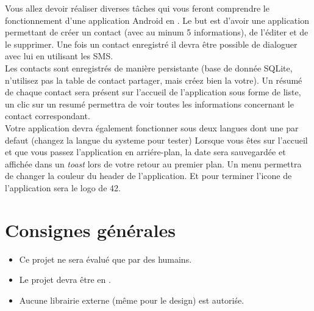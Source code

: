 \documentclass{42}
\begin{document}
	Vous allez devoir r\'ealiser diverses t\^aches qui vous feront comprendre le
	fonctionnement d'une application Android en \@JAVA.
	Le but est d'avoir une application permettant de cr\'eer un contact (avec au minum 5 informations),
	de l'\'editer et de le supprimer. Une fois un contact enregistr\'e il devra
	\^etre possible de dialoguer avec lui en utilisant les SMS.\\
	
	\vspace{5mm}
	Les contacts sont enregistr\'es de mani\`ere persistante (base de donn\'ee 
	SQLite, n'utilisez pas la table de contact partager, mais cr\'eez bien la votre).
	Un r\'esum\'e de chaque contact sera pr\'esent sur l'accueil de l'application
	sous forme de liste, un clic sur un resum\'e permettra de voir toutes les
	informations concernant le contact correspondant.\\

	\vspace{5mm}
	Votre application devra \'egalement fonctionner sous deux langues dont une par defaut
	(changez la langue du systeme pour tester) Lorsque vous \^etes
	sur l'accueil et que vous passez l'application en arri\'ere-plan, la date
	sera sauvegard\'ee et affich\'ee dans un \textit{toast} lors de votre
	retour au premier plan. Un menu permettra de changer la couleur du header
	de l'application. Et pour terminer l'icone de l'application sera le logo de
	42.

\chapter{Consignes g\'en\'erales}

	\begin{itemize}\itemsep6pt
		\item Ce projet ne sera évalué que par des humains.
		\item Le projet devra \^etre en \@JAVA.
		\item Aucune librairie externe (m\^eme pour le design) est autori\'se.
	\end{itemize}

\end{document}
